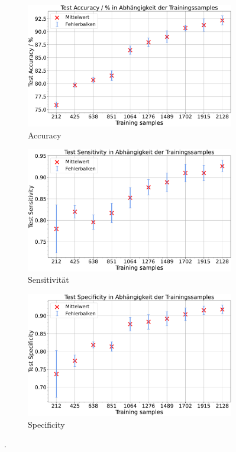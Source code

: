\begin{figure}[H]
  \centering
  \begin{subfigure}[b]{0.48\textwidth}
    \centering
    \includegraphics[width=\textwidth]{plots/Augm-Gli-Men_Accuracy_mean.pdf}
    \caption{Accuracy}
    \label{fig:augm-acc}
  \end{subfigure}
  \begin{subfigure}[b]{0.48\textwidth}
    \centering
    \includegraphics[width=\textwidth]{plots/Augm-Gli-Men_Sensitivity_mean.pdf}
    \caption{Sensitivität}
    \label{fig:augm-sens}
  \end{subfigure}
  \begin{subfigure}[b]{0.48\textwidth}
    \centering
    \includegraphics[width=\textwidth]{plots/Augm-Gli-Men_Specificity_mean.pdf}
    \caption{Specificity}
    \label{fig:augm-spec}
  \end{subfigure}
  \caption{.}
  \label{fig:gli-men-augm}
\end{figure}
